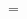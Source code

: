 \begin{table}[h]
\begin{adjustwidth}{-3cm}{-1cm}
\begin{tabular}{cccccccccc}
            \bottomrule
        \end{tabular}
    \end{adjustwidth}
\end{table}

=







